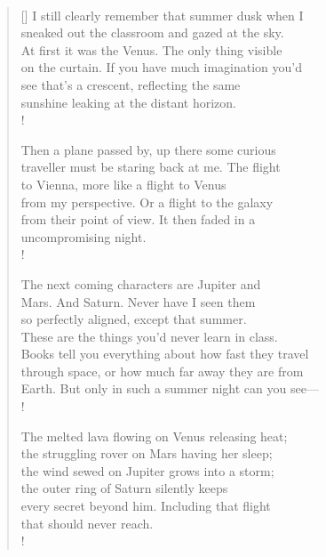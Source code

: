 \documentclass{book}
\begin{document}
\newpage
\poemtitle{\textcolor[RGB]{165,15,15}{A summer proscenium}}
\hspace*{\fill} \\
\settowidth{\versewidth}{engraved the grass with satire. That's when you find}
\begin{verse}[\versewidth]
    I still clearly remember that summer dusk when I\\
    sneaked out the classroom and gazed at the sky.\\
    At first it was the Venus. The only thing visible\\
    on the curtain. If you have much imagination you'd\\
    see that's a crescent, reflecting the same\\
    sunshine leaking at the distant horizon.\\!
    
    Then a plane passed by, up there some curious\\
    traveller must be staring back at me. The flight\\
    to Vienna, more like a flight to Venus\\
    from my perspective. Or a flight to the galaxy\\
    from their point of view. It then faded in a\\
    uncompromising night. \\!
    
    The next coming characters are Jupiter and\\
    Mars. And Saturn. Never have I seen them\\
    so perfectly aligned, except that summer. \\
    These are the things you'd never learn in class. \\
    Books tell you everything about how fast they travel \\
    through space, or how much far away they are from \\
    Earth. But only in such a summer night can you see---\\!
     
    The melted lava flowing on Venus releasing heat;\\
    the struggling rover on Mars having her sleep;\\
    the wind sewed on Jupiter grows into a storm;\\
    the outer ring of Saturn silently keeps\\
    every secret beyond him. Including that flight\\
    that should never reach.  \\!
    
\end{verse}
\end{document}

